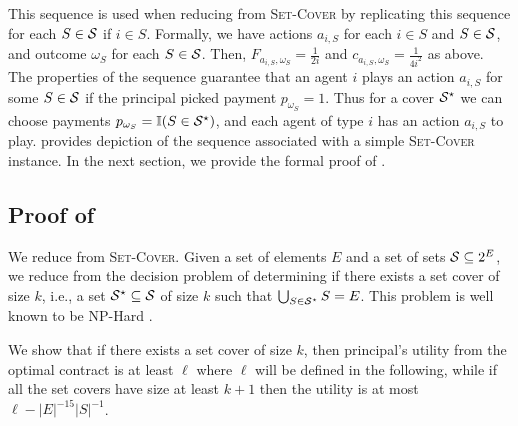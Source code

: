 This sequence is used when reducing from \textsc{Set-Cover} by replicating this sequence for each $S\in\mathcal{S}$ if $i\in S$. Formally, we have actions $a_{i,S}$ for each $i\in S$ and $S\in\mathcal{S}$, and outcome $\omega_S$ for each $S\in\mathcal{S}$. Then, $F_{a_{i,S},\omega_{S}}=\frac{1}{2i}$ and $c_{a_{i,S},\omega_S}=\frac{1}{4i^2}$ as above. The properties of the sequence guarantee that an agent $i$ plays an action $a_{i,S}$ for some $S\in\mathcal{S}$ if the principal picked payment $p_{\omega_S}=1$. Thus for a cover $\mathcal{S}^\star$ we can choose payments $p_{\omega_S}=\mathbb{I}(S\in\mathcal{S}^\star)$, and each agent of type $i$ has an action $a_{i,S}$ to play.
%
%
 provides depiction of the sequence associated with a simple \textsc{Set-Cover} instance. 
In the next section, we provide the formal proof of .

\subsection{Proof of }

	We reduce from \textsc{Set-Cover}.
	Given a set of elements $E$ and a set of sets $\mathcal{S} \subseteq 2^E$, we reduce from the decision problem of determining if there exists a set cover of size $k$, i.e., a set $\mathcal{S}^\star\subseteq \mathcal{S}$ of size $k$ such that 
	$\bigcup_{S \in \mathcal{S}^\star} S=E$. This problem is well known to be NP-Hard \cite{Karp1972}.
	
	We show that if there exists a set cover of size $k$, then principal's utility from the optimal contract is at least $\ell$ where $\ell$ will be defined in the following, while if all the set covers have size at least $k+1$ then the utility is at most $\ell-|E|^{-15}|S|^{-1}$.
	
